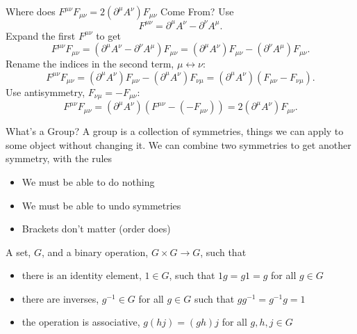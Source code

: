 \documentclass{beamer}
\begin{document}
    \begin{frame}{Where does \(F^{\mu\nu}F_{\mu\nu} = 2(\partial^\mu A^\nu)F_{\mu\nu}\) Come From?}
        Use
        \begin{equation*}
            F^{\mu\nu} = \partial^\mu A^\nu - \partial^\nu A^\mu.
        \end{equation*}
        Expand the first \(F^{\mu\nu}\) to get
        \begin{equation*}
            F^{\mu\nu}F_{\mu\nu} = (\partial^\mu A^\nu - \partial^\nu A^\mu)F_{\mu\nu} = (\partial^\mu A^\nu)F_{\mu\nu} - (\partial^\nu A^\mu)F_{\mu\nu}.
        \end{equation*}
        Rename the indices in the second term, \(\mu \leftrightarrow \nu\):
        \begin{equation*}
            F^{\mu\nu}F_{\mu\nu} = (\partial^\mu A^\nu)F_{\mu\nu} - (\partial^\mu A^\nu)F_{\nu\mu} = (\partial^\mu A^\nu)(F_{\mu\nu} - F_{\nu\mu}).
        \end{equation*}
        Use antisymmetry, \(F_{\nu\mu} = -F_{\mu\nu}\):
        \begin{equation*}
            F^{\mu\nu}F_{\mu\nu} = (\partial^\mu A^\nu)(F^{\mu\nu} - (-F_{\mu\nu})) = 2(\partial^\mu A^\nu)F_{\mu\nu}.
        \end{equation*}
    \end{frame}

    \begin{frame}{What's a Group?}
        A group is a collection of symmetries, things we can apply to some object without changing it.
        We can combine two symmetries to get another symmetry, with the rules
        \begin{itemize}
            \item We must be able to do nothing
            \item We must be able to undo symmetries
            \item Brackets don't matter (order does)
        \end{itemize}
        A set, \(G\), and a binary operation, \(G \times G \to G\), such that
        \begin{itemize}
            \item there is an identity element, \(1 \in G\), such that \(1g = g1 = g\) for all \(g \in G\)
            \item there are inverses, \(g^{-1} \in G\) for all \(g \in G\) such that \(gg^{-1} = g^{-1}g = 1\)
            \item the operation is associative, \(g(hj) = (gh)j\) for all \(g, h, j \in G\)
        \end{itemize}
    \end{frame}
    
\end{document}
